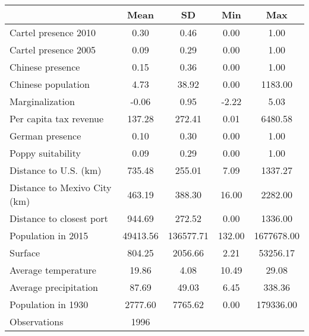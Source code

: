 {
\def\sym#1{\ifmmode^{#1}\else\(^{#1}\)\fi}
\begin{tabular}{l*{1}{cccc}}
\hline\hline
                    &        Mean&          SD&         Min&         Max\\
\hline
Cartel presence 2010&        0.30&        0.46&        0.00&        1.00\\
Cartel presence 2005&        0.09&        0.29&        0.00&        1.00\\
Chinese presence    &        0.15&        0.36&        0.00&        1.00\\
Chinese population  &        4.73&       38.92&        0.00&     1183.00\\
Marginalization     &       -0.06&        0.95&       -2.22&        5.03\\
Per capita tax revenue&      137.28&      272.41&        0.01&     6480.58\\
German presence     &        0.10&        0.30&        0.00&        1.00\\
Poppy suitability   &        0.09&        0.29&        0.00&        1.00\\
Distance to U.S. (km)&      735.48&      255.01&        7.09&     1337.27\\
Distance to Mexivo City (km)&      463.19&      388.30&       16.00&     2282.00\\
Distance to closest port&      944.69&      272.52&        0.00&     1336.00\\
Population in 2015  &    49413.56&   136577.71&      132.00&  1677678.00\\
Surface             &      804.25&     2056.66&        2.21&    53256.17\\
Average temperature &       19.86&        4.08&       10.49&       29.08\\
Average precipitation&       87.69&       49.03&        6.45&      338.36\\
Population in 1930  &     2777.60&     7765.62&        0.00&   179336.00\\
\hline
Observations        &        1996&            &            &            \\
\hline\hline
\end{tabular}
}
